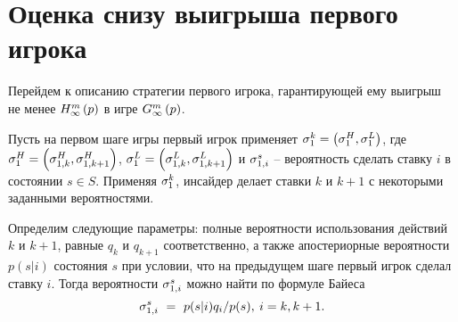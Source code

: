 {\section{Оценка снизу выигрыша первого игрока}\label{ch1:lower-bound}
Перейдем к описанию стратегии первого игрока, гарантирующей ему выигрыш не менее $\upperBound{p}$ в игре $\infiniteGame{p}$.

Пусть на первом шаге игры первый игрок применяет %
$\fGeneral{k} = \left(\fGeneral{H}, \fGeneral{L}\right)$, где %
$\fGeneral{H} = \left(\fGeneral[1,k]{H}, \fGeneral[1,k+1]{H}\right)$,
$\fGeneral{L} = \left(\fGeneral[1,k]{L}, \fGeneral[1,k+1]{L}\right)$ и
$\fGeneral[1,i]{s}$ -- вероятность сделать ставку $i$ в состоянии $s \in S$.
Применяя $\fGeneral{k}$, инсайдер делает ставки $k$ и $k+1$ с некоторыми заданными вероятностями.

Определим следующие параметры: полные вероятности использования действий $k$ и $k+1$, равные $q_k$ и $q_{k+1}$ соответственно, а также апостериорные вероятности $p(s|i)$ состояния $s$ при условии, что на предыдущем шаге первый игрок сделал ставку $i$.
Тогда вероятности $\fGeneral[1,i]{s}$ можно найти по формуле Байеса
\[
  \fGeneral[1,i]{s}~=~p(s|i)q_i/p(s), \: i = k, k + 1.
\]

}
